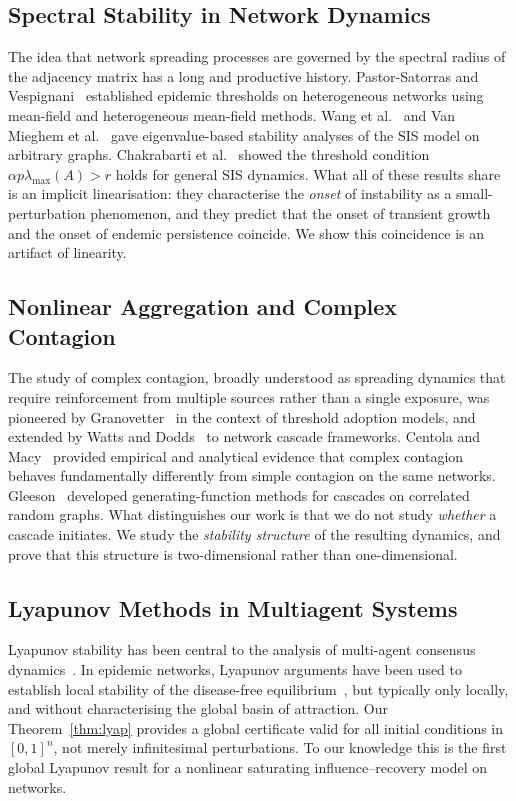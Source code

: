 \documentclass[10pt,twocolumn]{article}
\theoremstyle{myproof}
\newcommand{\lmax}{\lambda_{\max}}
\begin{document}
\subsection{Spectral Stability in Network Dynamics}
The idea that network spreading processes are governed by the spectral radius of the adjacency
matrix has a long and productive history. Pastor-Satorras and Vespignani~\cite{pastor2001}
established epidemic thresholds on heterogeneous networks using mean-field and heterogeneous
mean-field methods. Wang et al.~\cite{wang2003} and Van Mieghem et al.~\cite{vanmieghem2009}
gave eigenvalue-based stability analyses of the SIS model on arbitrary graphs. Chakrabarti et
al.~\cite{chakrabarti2008} showed the threshold condition $\alpha p\lmax(A)>r$ holds for
general SIS dynamics. What all of these results share is an implicit linearisation: they characterise
the \emph{onset} of instability as a small-perturbation phenomenon, and they predict that the
onset of transient growth and the onset of endemic persistence coincide. We show this coincidence
is an artifact of linearity.

\subsection{Nonlinear Aggregation and Complex Contagion}
The study of complex contagion, broadly understood as spreading dynamics that require reinforcement from multiple
sources rather than a single exposure, was pioneered by Granovetter~\cite{granovetter1978} in
the context of threshold adoption models, and extended by Watts and
Dodds~\cite{watts2002,dodds2004} to network cascade frameworks. Centola and
Macy~\cite{centola2007} provided empirical and analytical evidence that complex contagion behaves
fundamentally differently from simple contagion on the same networks. Gleeson~\cite{gleeson2008}
developed generating-function methods for cascades on correlated random graphs. What distinguishes
our work is that we do not study \emph{whether} a cascade initiates. We study the \emph{stability
structure} of the resulting dynamics, and prove that this structure is two-dimensional rather than
one-dimensional.

\subsection{Lyapunov Methods in Multiagent Systems}
Lyapunov stability has been central to the analysis of multi-agent consensus
dynamics~\cite{moreau2005,cao2013}. In epidemic networks, Lyapunov arguments have been used to
establish local stability of the disease-free equilibrium~\cite{pastor2015}, but typically only
locally, and without characterising the global basin of attraction. Our Theorem~\ref{thm:lyap}
provides a global certificate valid for all initial conditions in $[0,1]^n$, not merely
infinitesimal perturbations. To our knowledge this is the first global Lyapunov result for a
nonlinear saturating influence--recovery model on networks.
\end{document}
